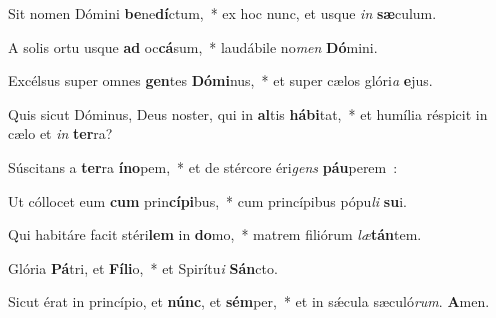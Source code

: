 ﻿\item Sit nomen Dómini \textbf{be}\-ne\textbf{dí}\-ctum,~* ex hoc nunc, et usque \emph{in} \textbf{sæ}culum.
\item A solis ortu usque \textbf{ad} oc\textbf{cá}\-sum,~* laudábile no\emph{men} \textbf{Dó}mini.
\item Excélsus super omnes \textbf{gen}\-tes \textbf{Dó}\-\textbf{mi}\-nus,~* et super cælos gló\-ri\-\emph{a} \textbf{e}jus.
\item Quis sicut Dóminus, Deus noster, qui in \textbf{al}\-tis \textbf{há}\-\textbf{bi}\-tat,~* et humília réspicit in cælo et \emph{in} \textbf{ter}ra?
\item Súscitans a \textbf{ter}\-ra \textbf{ín}\-\textbf{o}\-pem,~* et de stércore éri\emph{gens} \textbf{páu}perem~:
\item Ut cóllocet eum \textbf{cum} prin\textbf{cí}\-\textbf{pi}\-bus,~* cum princípibus pópu\emph{li} \textbf{su}i.
\item Qui habitáre facit stéri\textbf{lem} in \textbf{do}\-mo,~* matrem filiórum \emph{læ}\textbf{tán}tem.
\item Glória \textbf{Pá}\-tri, et \textbf{Fí}\-\textbf{li}\-o,~* et Spirítu\emph{i} \textbf{Sán}cto.
\item Sicut érat in princípio, et \textbf{núnc}, et \textbf{sém}\-per,~* et in sǽcula sæculó\emph{rum}. \textbf{A}men.